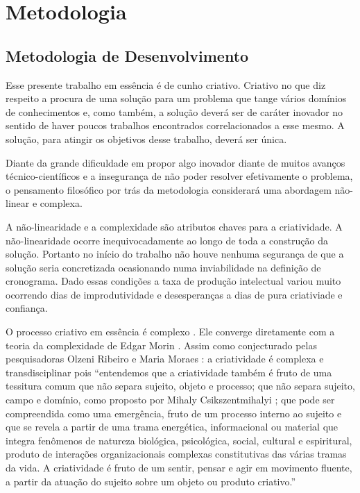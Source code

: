 \chapter{Metodologia}
\label{chap:metodologia}

\section{Metodologia de Desenvolvimento}
\label{sec:empirico}

Esse presente trabalho em essência é de cunho criativo. Criativo no que diz respeito a procura de uma solução para um problema que tange vários domínios de conhecimentos e, como também, a solução deverá ser de caráter inovador no sentido de haver poucos trabalhos encontrados correlacionados a esse mesmo. A solução, para atingir os objetivos desse trabalho, deverá ser única.

Diante da grande dificuldade em propor algo inovador diante de muitos avanços técnico-científicos e a insegurança de não poder resolver efetivamente o problema, o pensamento filosófico por trás da metodologia considerará uma abordagem não-linear e complexa.

A não-linearidade e a complexidade são atributos chaves para a criatividade. A não-linearidade ocorre inequivocadamente ao longo de toda a construção da solução. Portanto no início do trabalho não houve nenhuma segurança de que a solução seria concretizada ocasionando numa inviabilidade na definição de cronograma. Dado essas condições a taxa de produção intelectual variou muito ocorrendo dias de improdutividade e desesperanças a dias de pura criativiade e confiança.

O processo criativo em essência é complexo \cite{criatividade}. Ele converge diretamente com a teoria da complexidade de Edgar Morin \cite{morin}. Assim como conjecturado pelas pesquisadoras Olzeni Ribeiro e Maria Moraes \cite{criatividade}: a criatividade é complexa e transdisciplinar pois ``entendemos que a criatividade também é fruto de uma tessitura comum que não separa sujeito, objeto e processo; que não separa sujeito, campo e domínio, como proposto por Mihaly Csikszentmihalyi \cite{csikszentmihalyi}; que pode ser compreendida como uma emergência, fruto de um processo interno ao sujeito e que se revela a partir de uma trama energética, informacional ou material que integra fenômenos de natureza biológica, psicológica, social, cultural e espiritural, produto de interações organizacionais complexas constitutivas das várias tramas da vida. A criatividade é fruto de um sentir, pensar e agir em movimento fluente, a partir da atuação do sujeito sobre um objeto ou produto criativo.''

